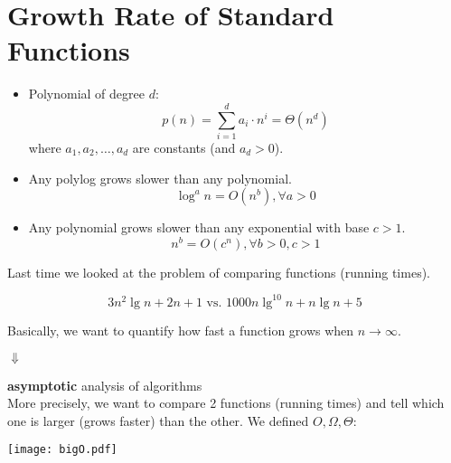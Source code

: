 \documentclass[11pt]{article}
\begin{document}
\section{Growth Rate of Standard Functions}

\begin{itemize}
\item Polynomial of degree $d$: 
$$p(n)=\sum_{i=1}^d a_i\cdot n^i = \Theta(n^d)$$ where $a_1, a_2,
  \dots, a_d$ are constants (and $a_d>0$).
 
\item Any polylog grows slower than any polynomial.  
$$\log ^a n = O(n^b), \forall a>0$$

\item Any polynomial grows slower than any exponential with base $c>1$. 
$$n^b = O(c^n), \forall b>0, c>1$$

\end{itemize}



Last time we looked at the problem of comparing functions (running times). 

$$3n^2 \lg n + 2n +1 \textrm{  vs.  } 1000 n \lg^{10}n + n \lg n +5$$

Basically, we want to quantify how fast a function grows when $n
\longrightarrow \infty$.

$\Downarrow$

{\bf asymptotic} analysis of algorithms\\

More precisely, we want to compare 2 functions (running times) and
tell which one is larger (grows faster) than the other.  We defined
$O, \Omega, \Theta$:

\begin{center}
\texttt{[image: bigO.pdf]}
\end{center}

\begin{center}
\end{center}
\end{document}
